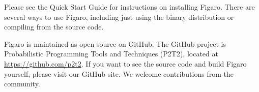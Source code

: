 


Please see the Quick Start Guide for instructions on installing Figaro. There are several ways to use Figaro, including just using the binary distribution or compiling from the source code.

Figaro is maintained as open source on GitHub. The GitHub project is Probabilistic Programming Tools and Techniques (P2T2), located at \url{https://github.com/p2t2}. If you want to see the source code and build Figaro yourself, please visit our GitHub site. We welcome contributions from the community.

